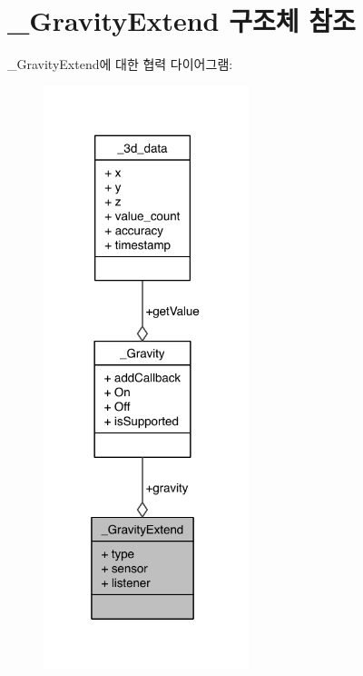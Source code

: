 \hypertarget{struct___gravity_extend}{\section{\-\_\-\-Gravity\-Extend 구조체 참조}
\label{struct___gravity_extend}
}


\-\_\-\-Gravity\-Extend에 대한 협력 다이어그램\-:\nopagebreak
\begin{figure}[H]
\begin{center}
\leavevmode
\includegraphics[width=169pt]{d8/db0/struct___gravity_extend__coll__graph}
\end{center}
\end{figure}
